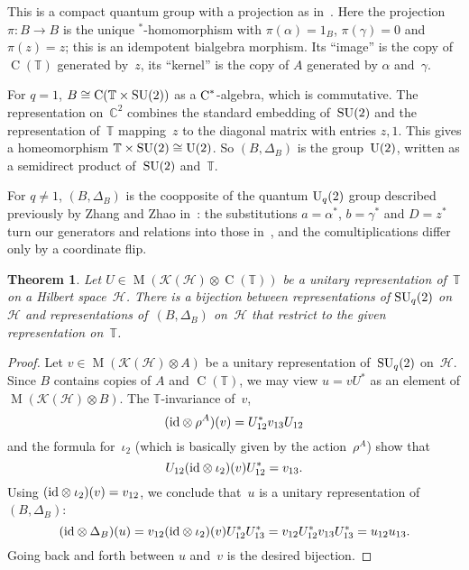 \documentclass[a4paper]{amsart}
\numberwithin{equation}{section}
\newtheorem{Thm}{Theorem}[section]
\theoremstyle{definition}
\theoremstyle{remark}
\begin{document}
This is a compact quantum group with a projection as
in~\cite{Roy:Qgrp_with_proj}.  Here the projection $\pi\colon
B\rightarrow B$ is the unique $^*${\nobreakdash}-homomorphism with $\pi(\alpha) =
1_{B}$, $\pi(\gamma) = 0$ and $\pi(z) = z$; this is an idempotent
bialgebra morphism.  Its ``image'' is the copy of \(\operatorname{C}(\mathbb{T})\)
generated by~\(z\), its ``kernel'' is the copy of \(A\) generated by
\(\alpha\) and~\(\gamma\).

For \(q=1\), \(B\cong \operatorname{C}(\mathbb{T}\times {\textup{SU}}(2))\) as a
\({\textup{C}^*}\){\nobreakdash}-algebra, which is commutative.  The representation
on~\({{\mathbb C}}^2\) combines the standard embedding of~\({\textup{SU}}(2)\) and the
representation of~\(\mathbb{T}\) mapping~\(z\) to the diagonal
matrix with entries \(z,1\).  This gives a homeomorphism
\(\mathbb{T}\times{\textup{SU}}(2) \cong {\textup{U}}(2)\).  So \((B,\Delta_B)\) is
the group~\({\textup{U}}(2)\), written as a semidirect product of~\({\textup{SU}}(2)\)
and~\(\mathbb{T}\).

For \(q\neq1\), \((B,\Delta_B)\) is the coopposite of the quantum
${\textup{U}}_q(2)$ group described previously by Zhang and Zhao
in~\cite{Zhang-Zhao:Uq2}: the substitutions \(a=\alpha^*\),
\(b=\gamma^*\) and \(D=z^*\) turn our generators and relations into
those in~\cite{Zhang-Zhao:Uq2}, and the comultiplications differ only
by a coordinate flip.

\begin{Thm}
  \label{the:repr_SU_U}
  Let $U\in {\operatorname{M}}(\mathcal{K}(\mathcal{H})\otimes\operatorname{C}(\mathbb{T}))$ be a
  unitary representation of~$\mathbb{T}$ on a Hilbert
  space~$\mathcal{H}$.  There is a bijection between representations
  of \({\textup{SU}}_q(2)\) on~\(\mathcal{H}\) and representations
  of~\((B,\Delta_B)\) on~\(\mathcal{H}\) that restrict to the given
  representation on~$\mathbb{T}$.
\end{Thm}

\begin{proof}
  Let $v\in {\operatorname{M}}(\mathcal{K}(\mathcal{H})\otimes A)$ be a
  unitary representation of~${\textup{SU}}_q(2)$ on~$\mathcal{H}$.  Since
  $B$ contains copies of $A$ and
  $\operatorname{C}(\mathbb{T})$, we may view $u=vU^*$ as an element of
  ${\operatorname{M}}(\mathcal{K}(\mathcal{H})\otimes B)$.  The
  $\mathbb{T}${\nobreakdash}-invariance of~$v$,
  \[
  ({\textup{id}}\otimes\rho^A)(v) = U_{12}^*v_{13}U_{12}
  \]
  and the formula for~$\iota_2$ (which is basically given by the
  action~$\rho^A$) show that
  \[
  U_{12}({\textup{id}}\otimes\iota_2)(v)U_{12}^* = v_{13}.
  \]
  Using $({\textup{id}}\otimes\iota_2)(v)=v_{12}$, we conclude that~$u$ is a
  unitary representation of~$(B,\Delta_B)$:
  \[
  ({\textup{id}}\otimes\Delta_B)(u) =
  v_{12}({\textup{id}}\otimes\iota_2)(v)U^*_{12}U^*_{13}
  = v_{12}U^*_{12}v_{13}U^*_{13} = u_{12}u_{13}.
  \]
  Going back and forth between \(u\) and~\(v\) is the desired
  bijection.
\end{proof}
\end{document}
